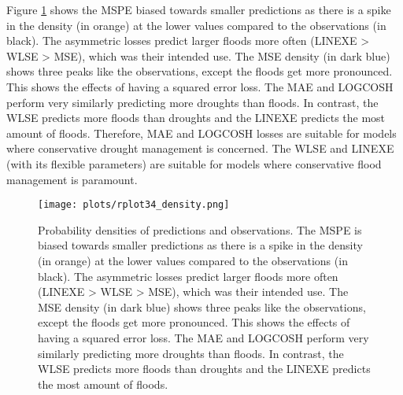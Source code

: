 Figure \ref{fig:densitych3} shows the MSPE biased towards smaller predictions as there is a spike in the density (in orange) at the lower values compared to the observations (in black). The asymmetric losses predict larger floods more often (LINEXE > WLSE > MSE), which was their intended use. The MSE density (in dark blue) shows three peaks like the observations, except the floods get more pronounced. This shows the effects of having a squared error loss. The MAE and LOGCOSH perform very similarly predicting more droughts than floods. In contrast, the WLSE predicts more floods than droughts and the LINEXE predicts the most amount of floods. Therefore, MAE and LOGCOSH losses are suitable for models where conservative drought management is concerned. The WLSE and LINEXE (with its flexible parameters) are suitable for models where conservative flood management is paramount. 


\begin{figure}
	\centering
	\texttt{[image: plots/rplot34\_density.png]}
	\caption[Probability densities of predictions and observations.]{Probability densities of predictions and observations. The MSPE is biased towards smaller predictions as there is a spike in the density (in orange) at the lower values compared to the observations (in black). The asymmetric losses predict larger floods more often (LINEXE > WLSE > MSE), which was their intended use. The MSE density (in dark blue) shows three peaks like the observations, except the floods get more pronounced. This shows the effects of having a squared error loss. The MAE and LOGCOSH perform very similarly predicting more droughts than floods. In contrast, the WLSE predicts more floods than droughts and the LINEXE predicts the most amount of floods.}
	\label{fig:densitych3}
\end{figure}

